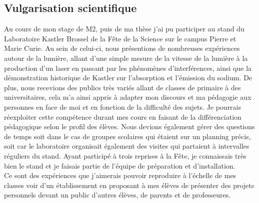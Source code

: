 \documentclass[a4paper,11pt]{article} %
\newcommand{\pointmedian}{{\fontfamily{cmr}\selectfont\textperiodcentered}}
\begin{document}
	\subsection{Vulgarisation scientifique}
	Au cours de mon stage de M2, puis de ma thèse j'ai pu participer au stand du Laboratoire Kastler Brossel de la Fête de la Science sur le campus Pierre et Marie Curie. Au sein de celui-ci, nous présentions de nombreuses expériences autour de la lumière, allant d'une \textgravedbl simple\textacutedbl{} mesure de la vitesse de la lumière à la production d'un laser en passant par les phénomènes d'interférences, ainsi que la démonstration historique de Kastler sur l'absorption et l'émission du sodium. De plus, nous recevions des publics très variés allant de classes de primaire à des universitaires, cela m'a ainsi appris à adapter mon discours et ma pédagogie aux personnes en face de moi et en fonction de la difficulté des sujets. Je pourrais réexploiter cette compétence durant mes cours en faisant de la différenciation pédagogique selon le profil des élèves. Nous devions également gérer des questions de temps soit dans le cas de groupes scolaires qui étaient sur un planning précis, soit car le laboratoire organisait également des visites qui partaient à intervalles réguliers du stand. Ayant participé à trois reprises à la Fête, je connaissais très bien le stand et je faisais partie de l'équipe de préparation et d'installation.\\
	
	Ce sont des expériences que j'aimerais pouvoir reproduire à l'échelle de mes classes voir d'un établissement en proposant à mes élèves de présenter des projets personnels devant un public d'autres élèves, de parents et de professeur\pointmedian es.
	
\end{document}
